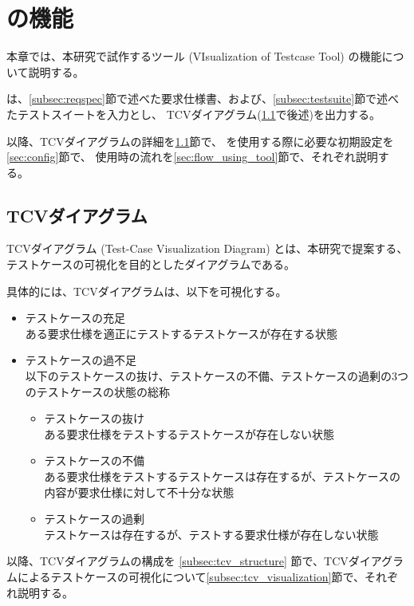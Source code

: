 \chapter{\tool{}の機能}\label{cha:Function}

本章では、本研究で試作するツール\tool{} (VIsualization of Testcase Tool) の機能について説明する。

\tool は、\ref{subsec:reqspec}節で述べた要求仕様書、および、\ref{subsec:testsuite}節で述べたテストスイートを入力とし、
TCVダイアグラム(\cref{sec:testcase_visualization_diagram}で後述)を出力する。

以降、TCVダイアグラムの詳細を\ref{sec:testcase_visualization_diagram}節で、
\tool を使用する際に必要な初期設定を\ref{sec:config}節で、
\tool 使用時の流れを\ref{sec:flow_using_tool}節で、それぞれ説明する。

\section{TCVダイアグラム}\label{sec:testcase_visualization_diagram}
TCVダイアグラム (Test-Case Visualization Diagram) とは、本研究で提案する、テストケースの可視化を目的としたダイアグラムである。

具体的には、TCVダイアグラムは、以下を可視化する。
\begin{itemize}
    \item テストケースの充足\\
    ある要求仕様を適正にテストするテストケースが存在する状態
    \item テストケースの過不足\\
    以下のテストケースの抜け、テストケースの不備、テストケースの過剰の3つのテストケースの状態の総称
    \begin{itemize}
        \item テストケースの抜け\\
        ある要求仕様をテストするテストケースが存在しない状態
        \item テストケースの不備\\
        ある要求仕様をテストするテストケースは存在するが、テストケースの内容が要求仕様に対して不十分な状態
        \item テストケースの過剰\\
        テストケースは存在するが、テストする要求仕様が存在しない状態
    \end{itemize}
\end{itemize}

以降、TCVダイアグラムの構成を \cref{subsec:tcv_structure} 節で、TCVダイアグラムによるテストケースの可視化について\cref{subsec:tcv_visualization}節で、それぞれ説明する。

